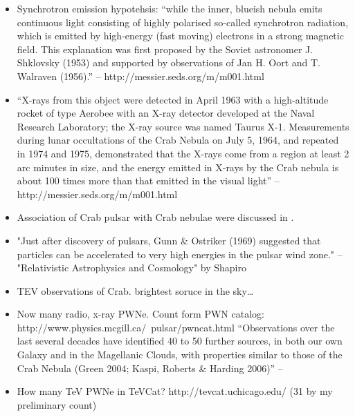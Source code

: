 \begin{itemize}
  \item Synchrotron emission hypotehsis: ``while the inner, blueish
      nebula emits continuous light consisting of highly polarised so-called
      synchrotron radiation, which is emitted by high-energy (fast moving)
      electrons in a strong magnetic field. This explanation was first
      proposed by the Soviet astronomer J. Shklovsky (1953) and supported
      by observations of Jan H. Oort and T. Walraven (1956).'' -- http://messier.seds.org/m/m001.html
  \item ``X-rays from this object were detected in April 1963 with a
      high-altitude rocket of type Aerobee with an X-ray detector developed
      at the Naval Research Laboratory; the X-ray source was named Taurus
      X-1. Measurements during lunar occultations of the Crab Nebula on
      July 5, 1964, and repeated in 1974 and 1975, demonstrated that the
      X-rays come from a region at least 2 arc minutes in size, and the
      energy emitted in X-rays by the Crab nebula is about 100 times more
      than that emitted in the visual light''
        -- http://messier.seds.org/m/m001.html
  \item Association of Crab pulsar with Crab nebulae were 
    discussed in \citep{staelin_1968_pulsating-radio}.

\item
"Just after discovery of pulsars, Gunn \& Ostriker (1969) suggested
that particles can be accelerated to very high energies in the pulsar
wind zone." -- "Relativistic Astrophysics and Cosmology" by Shapiro


  \item TEV observations of Crab. brightest soruce in the sky\ldots
  \item Now many radio, x-ray PWNe. Count form PWN catalog: http://www.physics.mcgill.ca/~pulsar/pwncat.html
    ``Observations over the last several decades have identified 40 to 50
    further sources, in both our own Galaxy and in the Magellanic Clouds,
    with properties similar to those of the Crab Nebula (Green 2004;
    Kaspi, Roberts \& Harding 2006)'' -- \cite{gaensler_2006_evolution-structure}
  \item How many TeV PWNe in TeVCat? http://tevcat.uchicago.edu/ (31 by my preliminary count)
\end{itemize}




